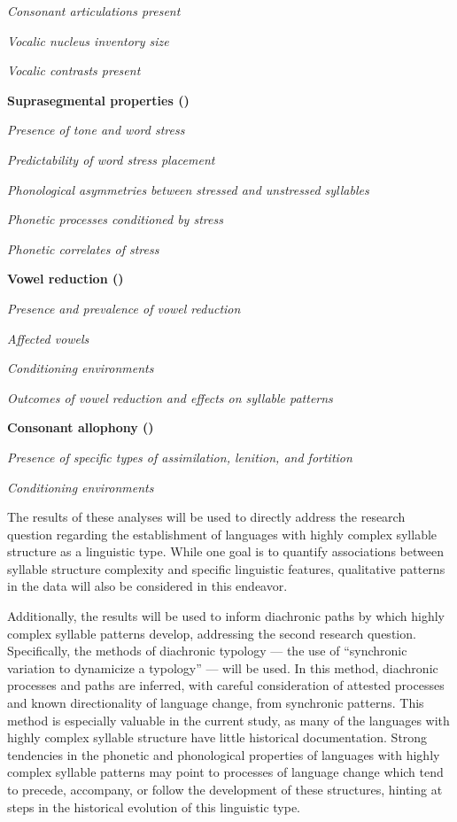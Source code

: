 \textit{Consonant articulations present}

\textit{Vocalic nucleus inventory size}

\textit{Vocalic contrasts present}

\textbf{Suprasegmental properties ()}

\textit{Presence of tone and word stress}

\textit{Predictability of word stress placement}

\textit{Phonological asymmetries between stressed and unstressed syllables}

\textit{Phonetic processes conditioned by stress}

\textit{Phonetic correlates of stress}

\textbf{Vowel reduction ()}

\textit{Presence and prevalence of vowel reduction}

\textit{Affected vowels}

\textit{Conditioning environments}

\textit{Outcomes of vowel reduction and effects on syllable patterns}

\textbf{Consonant allophony ()}

\textit{Presence of specific types of assimilation, lenition, and fortition}

\textit{Conditioning environments}
\z

  The results of these analyses will be used to directly address the research question regarding the establishment of languages with highly complex syllable structure as a linguistic type. While one goal is to quantify associations between syllable structure complexity and specific linguistic features, qualitative patterns in the data will also be considered in this endeavor.

  Additionally, the results will be used to inform diachronic paths by which highly complex syllable patterns develop, addressing the second research question. Specifically, the methods of diachronic typology — the use of “synchronic variation to dynamicize a typology” \citep[272]{Croft2003} — will be used. In this method, diachronic processes and paths are inferred, with careful consideration of attested processes and known directionality of language change, from synchronic patterns. This method is especially valuable in the current study, as many of the languages with highly complex syllable structure have little historical documentation. Strong tendencies in the phonetic and phonological properties of languages with highly complex syllable patterns may point to processes of language change which tend to precede, accompany, or follow the development of these structures, hinting at steps in the historical evolution of this linguistic type.

